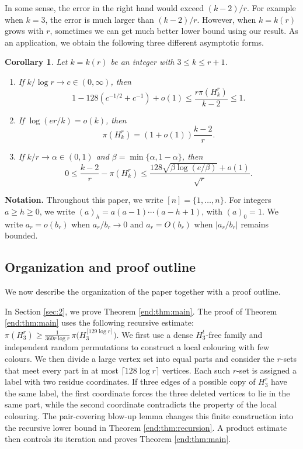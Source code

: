 \documentclass[10pt,a4paper]{amsart}
\numberwithin{equation}{section}
\newtheorem{corollary}[theorem]{Corollary}
\begin{document}
In some sense, the error in the right hand would exceed $(k-2)/r$. For example when $k=3$, the error is much larger than $(k-2)/r$. However, when $k=k(r)$ grows with $r$, sometimes we can get much better lower bound using our result.   As an application, we obtain the following three different asymptotic forms.


\begin{corollary}\label{cor:applications}
Let $k=k(r)$ be an integer with $3\le k\le r+1$.
\begin{enumerate}[label=\textup{(\roman*)}]
\item If $k/\log r\to c\in(0,\infty)$, then
\begin{equation*}
1-128\left(c^{-1/2}+c^{-1}\right)+o(1)
\le \frac{r\pi(H_k^r)}{k-2}\le1.
\end{equation*}
\item If $\log(er/k)=o(k)$, then
\begin{equation*}
\pi(H_k^r)=(1+o(1))\frac{k-2}{r}.
\end{equation*}
\item If $k/r\to\alpha\in(0,1)$ and $\beta=\min\{\alpha,1-\alpha\}$, then
\begin{equation*}
0\le\frac{k-2}{r}-\pi(H_k^r)
\le\frac{128\sqrt{\beta\log(e/\beta)}+o(1)}{\sqrt r}.
\end{equation*}
\end{enumerate}
\end{corollary}


\medskip
{\bf\noindent Notation.} Throughout this paper, we write $[n]=\{1,\ldots,n\}$. For integers $a\ge h\ge0$, we write $(a)_h=a(a-1)\cdots(a-h+1)$, with $(a)_0=1$.  
We write $a_r=o(b_r)$ when $a_r/b_r\to0$ and $a_r=O(b_r)$ when $|a_r/b_r|$ remains bounded.


\subsection*{Organization and proof outline}

We now describe the organization of the paper together with a proof outline.

In Section \ref{sec:2}, we prove Theorem \ref{end:thm:main}.  The proof of Theorem \ref{end:thm:main} uses the following recursive estimate: $\pi(H_3^r)\ge \frac{1}{360r\log r}\,\pi\bigl(H_3^{\lceil 129\log r\rceil}\bigr).$
We first use a dense $H_3^t$-free family and independent random permutations to construct a local colouring with few colours.  
We then divide a large vertex set into equal parts and consider the $r$-sets that meet every part in at most $\lceil 128\log r\rceil$ vertices.  
Each such $r$-set is assigned a label with two residue coordinates.  
If three edges of a possible copy of $H_3^r$ have the same label, the first coordinate forces the three deleted vertices to lie in the same part, 
while the second coordinate contradicts the property of the local colouring.  
The pair-covering blow-up lemma changes this finite construction into the recursive lower bound in Theorem \ref{end:thm:recursion}.  
A product estimate then controls its iteration and proves Theorem \ref{end:thm:main}.
\end{document}

